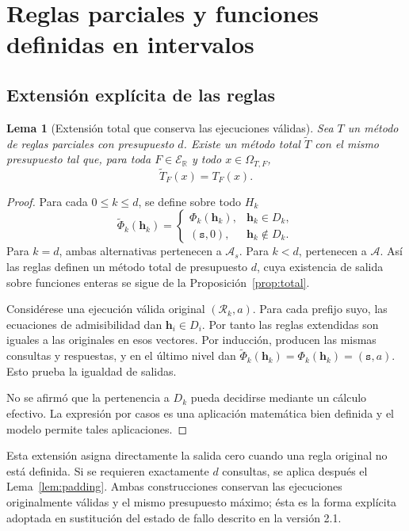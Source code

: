 \documentclass[11pt,a4paper]{article}
\numberwithin{equation}{section}
\newtheorem{lemma}[theorem]{Lema}
\theoremstyle{definition}
\theoremstyle{remark}
\newcommand{\R}{\mathbb R}
\newcommand{\ER}{\mathcal E_{\R}}
\newcommand{\Rec}{\mathcal R}
\newcommand{\hc}{\mathbf h}
\newcommand{\st}{\mathtt s}
\begin{document}
\clearpage
\section{Reglas parciales y funciones definidas en intervalos}\label{sec:partial}

\subsection{Extensión explícita de las reglas}
\begin{lemma}[Extensión total que conserva las ejecuciones válidas]\label{lem:extension}
Sea $T$ un método de reglas parciales con presupuesto $d$. Existe un método total $\widetilde T$ con el mismo presupuesto tal que, para toda $F\in\ER$ y todo $x\in\Omega_{T,F}$,
\[
\widetilde T_F(x)=T_F(x).
\]
\end{lemma}
\begin{proof}
Para cada $0\le k\le d$, se define sobre todo $H_k$
\[
\widetilde\Phi_k(\hc_k)=
\begin{cases}
\Phi_k(\hc_k),&\hc_k\in D_k,\\
(\st,0),&\hc_k\notin D_k.
\end{cases}
\]
Para $k=d$, ambas alternativas pertenecen a $\mathcal A_s$. Para $k<d$, pertenecen a $\mathcal A$. Así las reglas definen un método total de presupuesto $d$, cuya existencia de salida sobre funciones enteras se sigue de la Proposición~\ref{prop:total}.

Considérese una ejecución válida original $(\Rec_k,a)$. Para cada prefijo suyo, las ecuaciones de admisibilidad dan $\hc_i\in D_i$. Por tanto las reglas extendidas son iguales a las originales en esos vectores. Por inducción, producen las mismas consultas y respuestas, y en el último nivel dan $\widetilde\Phi_k(\hc_k)=\Phi_k(\hc_k)=(\st,a)$. Esto prueba la igualdad de salidas.

No se afirmó que la pertenencia a $D_k$ pueda decidirse mediante un cálculo efectivo. La expresión por casos es una aplicación matemática bien definida y el modelo permite tales aplicaciones.
\end{proof}

Esta extensión asigna directamente la salida cero cuando una regla original no está definida. Si se requieren exactamente $d$ consultas, se aplica después el Lema~\ref{lem:padding}. Ambas construcciones conservan las ejecuciones originalmente válidas y el mismo presupuesto máximo; ésta es la forma explícita adoptada en sustitución del estado de fallo descrito en la versión 2.1.
\end{document}
